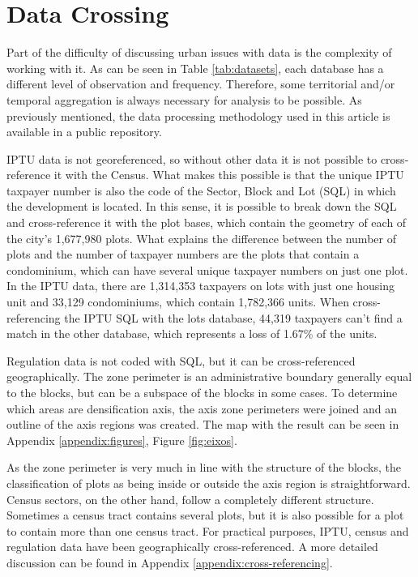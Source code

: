 \clearpage
\section{Data Crossing}
\label{sec:dataCruz}

Part of the difficulty of discussing urban issues with data is the complexity of working with it. As can be seen in Table \ref{tab:datasets}, each database has a different level of observation and frequency. Therefore, some territorial and/or temporal aggregation is always necessary for analysis to be possible. As previously mentioned, the data processing methodology used in this article is available in a public repository.



IPTU data is not georeferenced, so without other data it is not possible to cross-reference it with the Census. What makes this possible is that the unique IPTU taxpayer number is also the code of the Sector, Block and Lot (SQL) in which the development is located. In this sense, it is possible to break down the SQL and cross-reference it with the plot bases, which contain the geometry of each of the city's 1,677,980 plots. What explains the difference between the number of plots and the number of taxpayer numbers are the plots that contain a condominium, which can have several unique taxpayer numbers on just one plot. In the IPTU data, there are 1,314,353 taxpayers on lots with just one housing unit and 33,129 condominiums, which contain 1,782,366 units. When cross-referencing the IPTU SQL with the lots database, 44,319 taxpayers can't find a match in the other database, which represents a loss of 1.67\% of the units.

Regulation data is not coded with SQL, but it can be cross-referenced geographically. The zone perimeter is an administrative boundary generally equal to the blocks, but can be a subspace of the blocks in some cases. To determine which areas are densification axis, the axis zone perimeters were joined and an outline of the axis regions was created. The map with the result can be seen in Appendix \ref{appendix:figures}, Figure \ref{fig:eixos}.

As the zone perimeter is very much in line with the structure of the blocks, the classification of plots as being inside or outside the axis region is straightforward. Census sectors, on the other hand, follow a completely different structure. Sometimes a census tract contains several plots, but it is also possible for a plot to contain more than one census tract. For practical purposes, IPTU, census and regulation data have been geographically cross-referenced. A more detailed discussion can be found in Appendix \ref{appendix:cross-referencing}.

